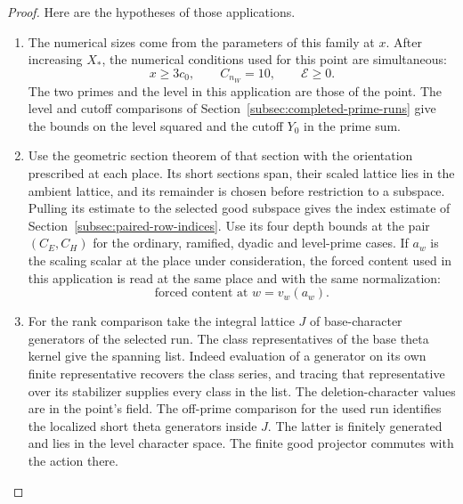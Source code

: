 \begin{proof}
Here are the hypotheses of those applications.
\begin{enumerate}
\item The numerical sizes come from the parameters of this family
at \(x\). After increasing \(X_*\), the numerical conditions used for this point are simultaneous:
\[
 x\ge3c_0,\qquad C_{n_W}=10,\qquad \mathcal E\ge0 .
\]
The two primes and the level in this application are those of the point. The level and
cutoff comparisons of Section~\ref{subsec:completed-prime-runs}
give the bounds on the level squared and the cutoff \(Y_0\)
in the prime sum.
\item Use the geometric section theorem of that section with
the orientation prescribed at each place. Its short sections
span, their scaled lattice lies in the ambient lattice, and
its remainder is chosen before restriction to a subspace.
Pulling its estimate to the selected good subspace gives the
index estimate of Section~\ref{subsec:paired-row-indices}.
Use its four depth bounds at the pair \((C_E,C_H)\) for the
ordinary, ramified, dyadic and level-prime cases. If \(a_w\) is the scaling scalar at the place under consideration, the forced content used in this application is read at the same place and with the same normalization:
\[
 \text{forced content at }w=v_w(a_w).
\]
\item For the rank comparison take the integral lattice \(J\)
of base-character generators of the selected run. The class representatives of
the base theta kernel give the spanning list. Indeed evaluation of a generator on its own finite
representative recovers the class series, and tracing that
representative over its stabilizer supplies every class in
the list. The deletion-character values are in the point's
field. The off-prime comparison for the used run identifies the
localized short theta generators inside \(J\). The latter is
finitely generated and lies in the level character space.
The finite good projector commutes with the action there.


\end{enumerate}
\end{proof}
